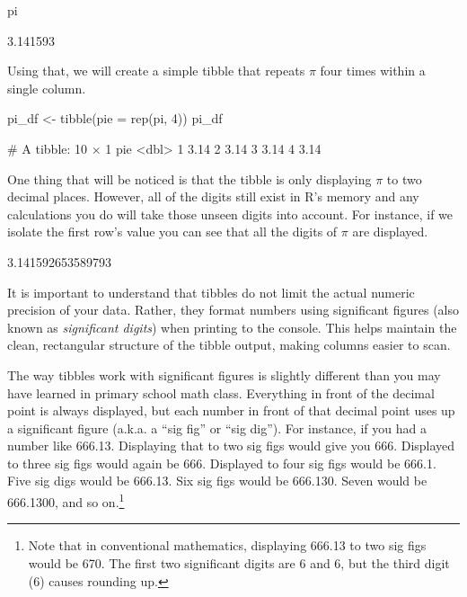 \begin{inR}
pi
\end{inR}
\begin{outR}
[1] 3.141593
\end{outR}

\noindent
Using that, we will create a simple tibble that repeats $\pi$ four times within a single column.

\begin{inR}
pi_df <- tibble(pie = rep(pi, 4))
pi_df
\end{inR}
\begin{outR}
# A tibble: 10 × 1
     pie
   <dbl>
 1  3.14
 2  3.14
 3  3.14
 4  3.14
\end{outR}

\noindent
One thing that will be noticed is that the tibble is only displaying $\pi$ to two decimal places. However, all of the digits still exist in R's memory and any calculations you do will take those unseen digits into account. For instance, if we isolate the first row's value you can see that all the digits of $\pi$ are displayed.

\begin{outR}
[1] 3.141592653589793
\end{outR}

\noindent
It is important to understand that tibbles do not limit the actual numeric precision of your data. Rather, they format numbers using \gls{significant figures} (also known as \textit{significant digits}) when printing to the console. This helps maintain the clean, rectangular structure of the tibble output, making columns easier to scan.

The way tibbles work with significant figures is slightly different than you may have learned in primary school math class. Everything in front of the decimal point is always displayed, but each number in front of that decimal point uses up a significant figure (a.k.a. a ``sig fig'' or ``sig dig''). For instance, if you had a number like 666.13.  Displaying that to two sig figs would give you 666. Displayed to three sig figs would again be 666. Displayed to four sig figs would be 666.1. Five sig digs would be 666.13. Six sig figs would be 666.130. Seven would be 666.1300, and so on.\footnote{Note that in conventional mathematics, displaying 666.13 to two sig figs would be 670. The first two significant digits are 6 and 6, but the third digit (6) causes rounding up.}

